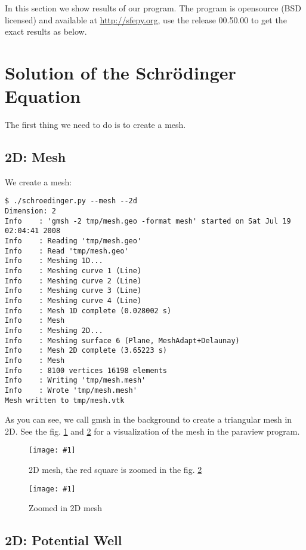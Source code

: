 In this section we show results of our program. The program is opensource (BSD
licensed) and available at \url{http://sfepy.org}, use the release 00.50.00 to
get the exact results as below.

\section{Solution of the Schr\"odinger Equation}

The first thing we need to do is to create a mesh.

\subsection{2D: Mesh}

We create a mesh:

\begin{lstlisting}
$ ./schroedinger.py --mesh --2d
Dimension: 2
Info    : 'gmsh -2 tmp/mesh.geo -format mesh' started on Sat Jul 19 02:04:41 2008
Info    : Reading 'tmp/mesh.geo'
Info    : Read 'tmp/mesh.geo'
Info    : Meshing 1D...
Info    : Meshing curve 1 (Line)
Info    : Meshing curve 2 (Line)
Info    : Meshing curve 3 (Line)
Info    : Meshing curve 4 (Line)
Info    : Mesh 1D complete (0.028002 s)
Info    : Mesh
Info    : Meshing 2D...
Info    : Meshing surface 6 (Plane, MeshAdapt+Delaunay)
Info    : Mesh 2D complete (3.65223 s)
Info    : Mesh
Info    : 8100 vertices 16198 elements
Info    : Writing 'tmp/mesh.mesh'
Info    : Wrote 'tmp/mesh.mesh'
Mesh written to tmp/mesh.vtk
\end{lstlisting}

As you can see, we call gmsh\cite{gmsh} in the background to create a
triangular mesh in 2D.
See the fig. \ref{fig:mesh2d} and \ref{fig:mesh2d2} for a visualization of the
mesh in the paraview\cite{paraview} program.

\def\fig#1#2#3{%
\begin{figure}[htp]
\centering
\texttt{[image: \#1]}
\caption{#3}\label{#2}
\end{figure}
}

\fig{images/mesh1-r.pdf}{fig:mesh2d}{2D mesh, the red square is zoomed in the fig.  \ref{fig:mesh2d2}}

\fig{images/mesh4.png}{fig:mesh2d2}{Zoomed in 2D mesh}

\subsection{2D: Potential Well}

